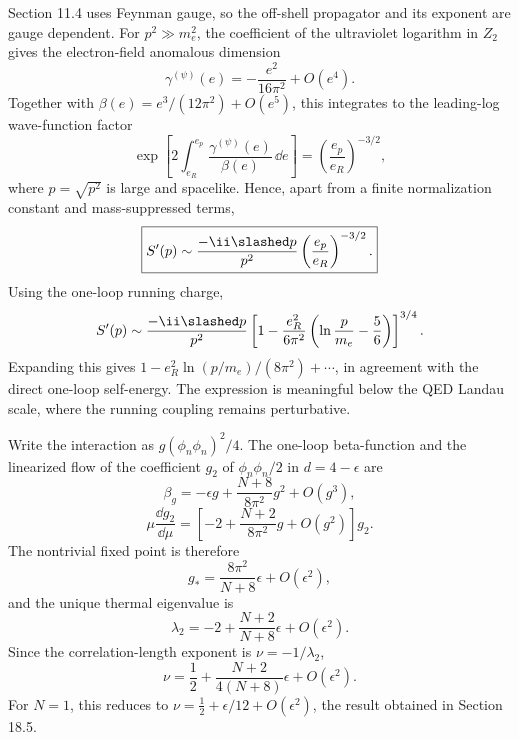 \begin{enumerate}
  Section 11.4 uses Feynman gauge, so the off-shell propagator and its
  exponent are gauge dependent.  For \(p^2\gg m_e^2\), the coefficient of
  the ultraviolet logarithm in \(Z_2\) gives the electron-field anomalous
  dimension
  \[
    \gamma^{(\psi)}(e)=-\frac{e^2}{16\pi^2}+O(e^4).
  \]
  Together with
  \(\beta(e)=e^3/(12\pi^2)+O(e^5)\), this integrates to the leading-log
  wave-function factor
  \[
    \exp\left[2\int_{e_R}^{e_p}
      \frac{\gamma^{(\psi)}(e)}{\beta(e)}\,\dd e\right]
      =\left(\frac{e_p}{e_R}\right)^{-3/2},
  \]
  where \(p=\sqrt{p^2}\) is large and spacelike.  Hence, apart from a
  finite normalization constant and mass-suppressed terms,
  \[
    \boxed{S'(p)\sim
      \frac{-\ii\slashed p}{p^2}
      \left(\frac{e_p}{e_R}\right)^{-3/2}.}
  \]
  Using the one-loop running charge,
  \[
    S'(p)\sim\frac{-\ii\slashed p}{p^2}
      \left[
        1-\frac{e_R^2}{6\pi^2}
        \left(\ln\frac{p}{m_e}-\frac56\right)
      \right]^{3/4}.
  \]
  Expanding this gives
  \(1-e_R^2\ln(p/m_e)/(8\pi^2)+\cdots\), in agreement with the direct
  one-loop self-energy.  The expression is meaningful below the QED
  Landau scale, where the running coupling remains perturbative.

  Write the interaction as
  \(g(\phi_n\phi_n)^2/4\).  The one-loop beta-function and the linearized
  flow of the coefficient \(g_2\) of
  \(\phi_n\phi_n/2\) in \(d=4-\epsilon\) are
  \[
    \beta_g=-\epsilon g+\frac{N+8}{8\pi^2}g^2+O(g^3),
  \]
  \[
    \mu\frac{\dd g_2}{\dd\mu}
      =\left[-2+\frac{N+2}{8\pi^2}g+O(g^2)\right]g_2.
  \]
  The nontrivial fixed point is therefore
  \[
    g_*=\frac{8\pi^2}{N+8}\epsilon+O(\epsilon^2),
  \]
  and the unique thermal eigenvalue is
  \[
    \lambda_2=-2+\frac{N+2}{N+8}\epsilon+O(\epsilon^2).
  \]
  Since the correlation-length exponent is
  \(\nu=-1/\lambda_2\),
  \[
    \boxed{\nu
      =\frac12+\frac{N+2}{4(N+8)}\epsilon
       +O(\epsilon^2).}
  \]
  For \(N=1\), this reduces to
  \(\nu=\frac12+\epsilon/12+O(\epsilon^2)\), the result obtained in
  Section 18.5.
\end{enumerate}
